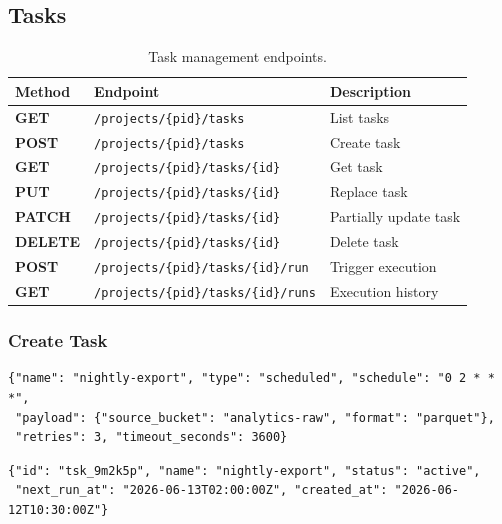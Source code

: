 \documentclass[
    language=english,
    doctype=article,
    institution=none,
]{../../omnilatex}
\newcommand{\methodget}{\textcolor{green!50!black}{\textbf{GET}}}
\newcommand{\methodpost}{\textcolor{blue!70!black}{\textbf{POST}}}
\newcommand{\methodput}{\textcolor{orange!80!black}{\textbf{PUT}}}
\newcommand{\methodpatch}{\textcolor{purple!70!black}{\textbf{PATCH}}}
\newcommand{\methoddelete}{\textcolor{red!70!black}{\textbf{DELETE}}}
\begin{document}
\subsection{Tasks}
\label{sec:tasks}
\begin{table}[htbp]
    \centering
    \caption{Task management endpoints.}
    \label{tab:tasks-ep}
    \begin{tabular}{@{}llp{5cm}@{}}
        \toprule
        \textbf{Method} & \textbf{Endpoint} & \textbf{Description} \\
        \midrule
        \methodget    & \texttt{/projects/\{pid\}/tasks}              & List tasks \\
        \methodpost   & \texttt{/projects/\{pid\}/tasks}              & Create task \\
        \methodget    & \texttt{/projects/\{pid\}/tasks/\{id\}}       & Get task \\
        \methodput    & \texttt{/projects/\{pid\}/tasks/\{id\}}       & Replace task \\
        \methodpatch  & \texttt{/projects/\{pid\}/tasks/\{id\}}       & Partially update task \\
        \methoddelete & \texttt{/projects/\{pid\}/tasks/\{id\}}       & Delete task \\
        \methodpost   & \texttt{/projects/\{pid\}/tasks/\{id\}/run}   & Trigger execution \\
        \methodget    & \texttt{/projects/\{pid\}/tasks/\{id\}/runs}  & Execution history \\
        \bottomrule
    \end{tabular}
\end{table}

\subsubsection{Create Task}
\begin{reqbox}
\begin{verbatim}
{"name": "nightly-export", "type": "scheduled", "schedule": "0 2 * * *",
 "payload": {"source_bucket": "analytics-raw", "format": "parquet"},
 "retries": 3, "timeout_seconds": 3600}
\end{verbatim}
\end{reqbox}
\begin{resbox}[201 Created]
\begin{verbatim}
{"id": "tsk_9m2k5p", "name": "nightly-export", "status": "active",
 "next_run_at": "2026-06-13T02:00:00Z", "created_at": "2026-06-12T10:30:00Z"}
\end{verbatim}
\end{resbox}
\end{document}
